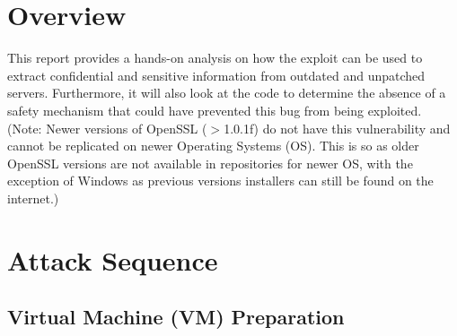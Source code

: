 \documentclass[a4paper,12pt]{article}
\begin{document}
	\section{Overview}
	This report provides a hands-on analysis on how the exploit can be used to extract confidential and sensitive information from outdated and unpatched servers. Furthermore, it will also look at the code to determine the absence of a safety mechanism that could have prevented this bug from being exploited. (Note: Newer versions of OpenSSL ($>$1.0.1f) do not have this vulnerability and cannot be replicated on newer Operating Systems (OS). This is so as older OpenSSL versions are not available in repositories for newer OS, with the exception of Windows as previous versions installers can still be found on the internet.)

	\begin{par}
		\end{par}
		\newpage
	\section{Attack Sequence}
	\subsection{Virtual Machine (VM) Preparation}
\end{document}
